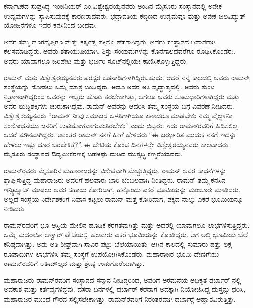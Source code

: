 
ಕರ್ನಾಟಕದ ಸುಪ್ರಸಿದ್ಧ ಇಂಜಿನಿಯರ್ ಎಂ.ವಿಶ್ವೇಶ್ವರಯ್ಯನವರು ಅಂದಿನ ಮೈಸೂರು ಸಂಸ್ಥಾನದಲ್ಲಿ ಅನೇಕ ಉದ್ಯಮಗಳನ್ನು ಸ್ಥಾಪಿಸುವುದಕ್ಕೆ ಕಾರಣರಾದವರು. ಭದ್ರಾವತಿಯ ಕಬ್ಬಿಣದ ಉದ್ಯಮವೂ ಮತ್ತು ಅನೇಕ ಜಲವಿದ್ಯುತ್ ಯೋಜನೆಗಳೂ ಇವರ ಕನಸಿನಿಂದ ಬಂದವು.

ಅವರ ತಮ್ಮ ದೂರದೃಷ್ಠಿಗೂ ಮತ್ತು ಕರ್ತೃತ್ವ ಶಕ್ತಿಗೂ ಹೆಸರಾಗಿದ್ದರು. ಅವರು ಸಂಸ್ಥಾನದ ದಿವಾನರಾಗಿ ಕೆಲಸಮಾಡಿದ್ದರು. ಅವರು ಶತಾಯುಷಿಯಾಗಿ, ಶಿಸ್ತು ಸಂಯಮಗಳನ್ನು ಕೊನೆಗಾಲದವರೆಗೂ ರೂಢಿಸಿಕೊಂಡರು. ಅವರು ಯಾವಾಗಲೂ ಜರಿಪೇಟ ಮತ್ತು ಭರ್ಜರಿ ಸೂಟ್‍ನಲ್ಲಿಯೇ ಕಾಣಿಸಿಕೊಳ್ಳುತ್ತಿದ್ದರು.

ರಾಮನ್ ಮತ್ತು ವಿಶ್ವೇಶ್ವರಯ್ಯನವರು ಪರಸ್ಪರ ಒಡನಾಡಿಗಳಾಗಿದ್ದಿರಬಹುದು. ಆದರೆ ನನ್ನ ಕಾಲದಲ್ಲಿ ಅವರು ರಾಮನ್ ಸಂಸ್ಥೆಯನ್ನು ನೋಡಲು ಒಮ್ಮೆ ಮಾತ್ರ ಬಂದಿದ್ದರು. ಅದೂ ಅವರ ಅತಿ ವೃದ್ಧಾಪ್ಯದಲ್ಲಿ. ಅವರು ತುಂಬ ನಿತ್ರಾಣರಾಗಿದ್ದರಿಂದ ಅವರನ್ನು ಇಬ್ಬರು ಹೊತ್ತು ತರಬೇಕಾಗಿತ್ತು, ಆಗಲೂ ಅವರು ಸೂಟುಧಾರಿಗಳಾಗಿದ್ದರು ಮತ್ತು ಅವರ ಬುದ್ಧಿಶಕ್ತಿಗಳು ಚುರುಕಾಗಿದ್ದವು. ರಾಮನ್ ಅವರನ್ನು ಆದರಿಸಿ ತಮ್ಮ ಸಂಸ್ಥೆಯ ಬಗ್ಗೆ ವಿವರಣೆ ನೀಡಿದರು. ವಿಶ್ವೇಶ್ವರಯ್ಯನವರು\enginline{-} “ರಾಮನ್ ನೀವು ಸಮಾಜದ ಒಳತಿಗಾಗಿಯೂ ಏನಾದರೂ ಮಾಡಬೇಕು ನಿಮ್ಮ ವೈಜ್ಞಾನಿಕ ಸಂಶೋಧನೆಯು ಜನರಿಗೆ ಉಪಯೋಗವಾಗುವಂತಿರಬೇಕು” ಎಂದು ಬಿಟ್ಟರು. ಇದು ರಾಮನ್‍ರವರಿಗೆ ಹಿಡಿಸಲಿಲ್ಲ. ಆದರೆ ಮೌನವಾಗಿದ್ದರು. ಅನಂತರ ರಾಮನ್ ನನಗೆ ಹೀಗೆ ಹೇಳಿದರು\enginline{-} “ಈ ಜರ್ಝರಿತ ಮುದುಕ ನನಗೆ ಇದನ್ನು ಹೇಳಲು ಇಷ್ಟು ದೂರ ಬರಬೇಕಿತ್ತೆ?”. ಈ ಭೇಟಿಯ ಕೊಂಚ ದಿನಗಳಲ್ಲೇ ವಿಶ್ವೇಶ್ವರಯ್ಯನವರು ಕಾಲವಾದರು. ಮೈಸೂರು ಸಂಸ್ಥಾನದ ಔದ್ಯಮೀಕರಣಕ್ಕೆ ಬಹಳಷ್ಟು ದುಡಿದ ಮುತ್ಸದ್ಧಿ ಕಣ್ಮರೆಯಾದರು.



ರಾಮನ್‍ರವರು ಮೈಸೂರಿನ ಮಹಾರಾಜರನ್ನು ವಿಶೇಷವಾಗಿ ಮೆಚ್ಚುತ್ತಿದ್ದರು. ರಾಮನ್ ಅವರ ಸಾಧನೆಗಳನ್ನು ಶ್ಲಾಘಿಸುತ್ತಿದ್ದ ಮಹಾರಾಜರು ಅವರಿಗೆ ಹಲವಾರು ಬಾರಿ ಬೆಂಬಲವಾಗಿ ನಿಂತಿದ್ದರು. ರಾಮನ್ ತಮ್ಮ ಕನಸಿನ ಇನ್ಸ್ಟಿಟ್ಯೂಟ್ ಮಾಡಲು ಅವರ ಸಹಾಯ ಕೋರಿದಾಗ, ಹನ್ನೊಂದು ಎಕರೆ ಭೂಮಿಯನ್ನು ಮಂಜೂರು ಮಾಡಿದರು. ಅಲ್ಲದೆ ಸಂಸ್ಥೆಯ ನಿರ್ದೇಶಕರಿಗೆ ನಿವಾಸ ಕಟ್ಟಲು ರಾಮನ್ ಮತ್ತೆ ಕೋರಿದಾಗ, ಪಕ್ಕದ ನಾಲ್ಕು ಎಕರೆ ಭೂಮಿಯನ್ನೂ ನೀಡಿದರು.

ರಾಮನ್‍ರವರಿಗೆ ಭೂ ಆಸ್ತಿಯ ಮೇಲಿನ ಹೂಡಿಕೆ ಕರಗತವಾಗಿತ್ತು ಮತ್ತು ಅದರಲ್ಲಿ ಯಾವಾಗಲೂ ಲಾಭಗಳಿಸುತ್ತಿದ್ದರು. ಒಮ್ಮೆ ಮದರಾಸಿನ ಆಳ್ವಾರ್ ಪೇಟೆಯಲ್ಲಿ ಹಲವಾರು ಎಕರೆ ಭೂಮಿಯನ್ನು ಕೊಂಡಿದ್ದರು. ಆಗ ಅಲ್ಲಿ ಭೂಮಿಯ ಬೆಲೆ ಕನಿಷ್ಠವಾಗಿತ್ತು. ಅದು ಅತಿ ಶೀಘ್ರವಾಗಿ ಸಾವಿರ ಪಟ್ಟು ಬೆಲೆಯಾಯಿತು. ಆಗಿನ ಕಾಲದಲ್ಲಿ ಸುಮಾರು ಹತ್ತು ಲಕ್ಷ ರೂಪಾಯಿಗಳ ಲಾಭಗಳಿಸಿ ತಮ್ಮ ಸಂಸ್ಥೆಗೆ ಉಪಯೋಗಿಸಿಕೊಂಡರು. ಮಹಾರಾಜರ ಭೂಮಿ ದೇಣಿಗೆಯು ರಾಮನ್‍ರವರಿಗೆ ಅತಿಮೌಲ್ಯದ ಮತ್ತು ಶ್ರೇಷ್ಠ ಉಡುಗೊರೆಯಾಗಿತ್ತು.

ಮಹಾರಾಜರು ರಾಮನ್‍ರವರಿಗೆ ಸಂಸ್ಥಾನದ ಸನ್ಮಾನ ನೀಡಿದ್ದರಿಂದ, ಅವರಿಗೆ ಅರಮನೆಯ ಅಧಿಕೃತ ದರ್ಬಾರ್ ನಲ್ಲಿ ಅವಕಾಶ ಮತ್ತು ಕರ್ತವ್ಯಗಳಿದ್ದವು. ದಸರಾ ದಿನಗಳಲ್ಲಿ ದರ್ಬಾರ್ ಕರೆದಾಗ ಅದಕ್ಕಾಗಿ ನಿಯೋಜಿಸಿದ್ದ ದುಸ್ತನ್ನು ಧರಿಸಿ, ಮಹಾರಾಜರ ಮುಂದೆ ಗೌರವ ಸಲ್ಲಿಸಬೇಕಾಗಿತ್ತು. ರಾಮನ್‍ರವರಿಗೆ ನಿರಂತರವಾಗಿ ದರ್ಬಾರ್‍ಗೆ ಆಹ್ವಾನವಿರುತ್ತಿತ್ತು.

